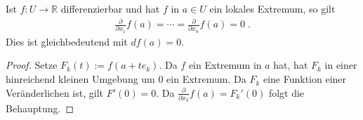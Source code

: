 \begin{Satz}
 Ist $f: U  \to \mathbb{R}$ differenzierbar und hat  $f$ in $a \in U$ ein lokales Extremum, so gilt 
\begin{align*}
\frac{\partial}{\partial x_{1}}f(a)  = \cdots  = \frac{\partial}{\partial x_{n}} f(a) = 0 \;.
\end{align*}
Dies ist gleichbedeutend mit $df(a) = 0$.
\end{Satz}
\begin{proof}
Setze $F_k(t) := f(a + t e_k)$. Da $f$ ein Extremum in $a$ hat, hat $F_k$ in einer hinreichend kleinen Umgebung um $0$ ein Extremum. 
Da $F_k$ eine Funktion einer Veränderlichen ist, gilt $F'(0) = 0$. Da $\frac{\partial}{\partial x_k} f(a) = F_k'(0)$ folgt die Behauptung.
\end{proof}

